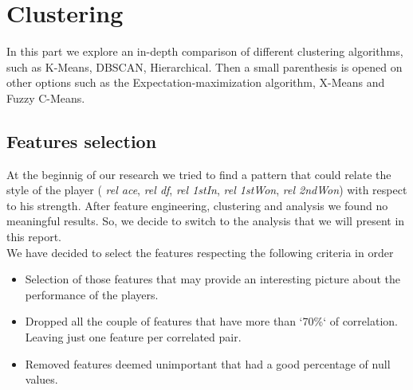 \section{Clustering}
\label{sec:clustering}
In this part we explore an in-depth comparison of different clustering algorithms, such as K-Means, DBSCAN, Hierarchical. Then a small parenthesis is opened on other options such as the Expectation-maximization algorithm, X-Means and Fuzzy C-Means.

\subsection{Features selection}
At the beginnig of our research we tried to find a pattern that could relate the style of the player ( \textit{rel ace},  \textit{rel df},  \textit{rel 1stIn},  \textit{rel 1stWon},  \textit{rel 2ndWon}) with respect to his strength. After feature engineering, clustering and analysis we found no meaningful results. So, we decide to switch to the analysis that we will present in this report.
\\We have decided to select the features respecting the following criteria in order
\begin{itemize}
	\item Selection of those features that may provide an interesting picture about the performance of the players.
	\item Dropped all the couple of features that have more than `70\%` of correlation. Leaving just one feature per correlated pair.
	\item Removed features deemed unimportant that had a good percentage of null values.
\end{itemize}

